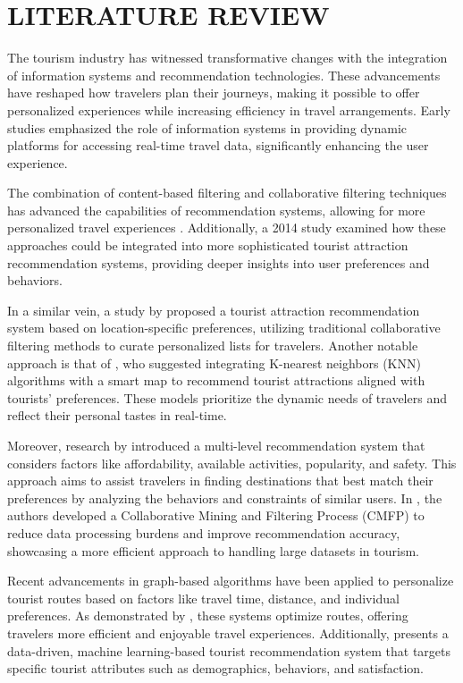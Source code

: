\chapter{LITERATURE REVIEW}
\noindent The tourism industry has witnessed transformative changes with the integration of information systems and recommendation technologies. These advancements have reshaped how travelers plan their journeys, making it possible to offer personalized experiences while increasing efficiency in travel arrangements. Early studies \cite{BUHALIS2008609} emphasized the role of information systems in providing dynamic platforms for accessing real-time travel data, significantly enhancing the user experience.

The combination of content-based filtering and collaborative filtering techniques has advanced the capabilities of recommendation systems, allowing for more personalized travel experiences \cite{francesco2011recommender}. Additionally, a 2014 study examined how these approaches could be integrated into more sophisticated tourist attraction recommendation systems, providing deeper insights into user preferences and behaviors.

In a similar vein, a study by \cite{manjare2016recommendation} proposed a tourist attraction recommendation system based on location-specific preferences, utilizing traditional collaborative filtering methods to curate personalized lists for travelers. Another notable approach is that of \cite{wahyono2020new}, who suggested integrating K-nearest neighbors (KNN) algorithms with a smart map to recommend tourist attractions aligned with tourists' preferences. These models prioritize the dynamic needs of travelers and reflect their personal tastes in real-time.

Moreover, research by \cite{alrasheed2020multi} introduced a multi-level recommendation system that considers factors like affordability, available activities, popularity, and safety. This approach aims to assist travelers in finding destinations that best match their preferences by analyzing the behaviors and constraints of similar users. In \cite{nan2022design}, the authors developed a Collaborative Mining and Filtering Process (CMFP) to reduce data processing burdens and improve recommendation accuracy, showcasing a more efficient approach to handling large datasets in tourism.

Recent advancements in graph-based algorithms have been applied to personalize tourist routes based on factors like travel time, distance, and individual preferences. As demonstrated by \cite{kondra2024development}, these systems optimize routes, offering travelers more efficient and enjoyable travel experiences. Additionally, \cite{computation12030059} presents a data-driven, machine learning-based tourist recommendation system that targets specific tourist attributes such as demographics, behaviors, and satisfaction.

